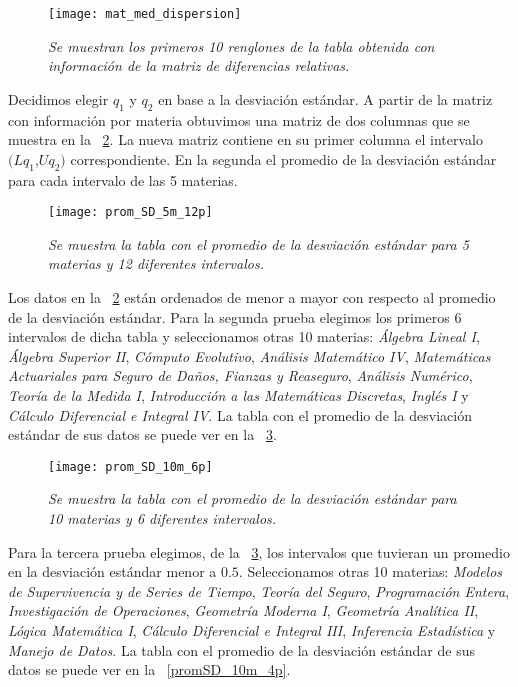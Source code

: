 \begin{figure}[H]
\centering
\texttt{[image: mat\_med\_dispersion]} %
\caption[\textit{Matriz con información por materia}]{\textit{Se muestran los primeros 10 renglones de la tabla obtenida con información de la matriz de diferencias relativas.}}\label{matMedDispersion}
\end{figure}


Decidimos elegir $q_{1}$ y $q_{2}$ en base a la desviación estándar. A partir de la matriz con información por materia obtuvimos una matriz de dos columnas que se muestra en la \figurename{~\ref{promSD_5m_12p}}. La nueva matriz contiene en su primer columna el intervalo $(Lq_{1}$,$Uq_{2})$ correspondiente. En la segunda el promedio de la desviación estándar para cada intervalo de las 5 materias.

\begin{figure}[H]
\centering
\texttt{[image: prom\_SD\_5m\_12p]} %
\caption[\textit{Promedio de la desviación estándar: 5 materias, 12 intervalos}]{\textit{Se muestra la tabla con el promedio de la desviación estándar para 5 materias y 12 diferentes intervalos.}}\label{promSD_5m_12p}
\end{figure}


Los datos en la \figurename{~\ref{promSD_5m_12p}} están ordenados de menor a mayor con respecto al promedio de la desviación estándar. Para la segunda prueba elegimos los primeros 6 intervalos de dicha tabla y seleccionamos otras 10 materias: \textit{Álgebra Lineal I}, \textit{Álgebra Superior II}, \textit{Cómputo Evolutivo}, \textit{Análisis Matemático IV}, \textit{Matemáticas Actuariales para Seguro de Daños, Fianzas y Reaseguro}, \textit{Análisis Numérico}, \textit{Teoría de la Medida I}, \textit{Introducción a las Matemáticas Discretas}, \textit{Inglés I} y \textit{Cálculo Diferencial e Integral IV}. La tabla con el promedio de la desviación estándar de sus datos se puede ver en la \figurename{~\ref{promSD_10m_6p}}.


\begin{figure}[H]
\centering
\texttt{[image: prom\_SD\_10m\_6p]} %
\caption[\textit{Promedio de la desviación estándar: 10 materias, 6 intervalos}]{\textit{Se muestra la tabla con el promedio de la desviación estándar para 10 materias y 6 diferentes intervalos.}}\label{promSD_10m_6p}
\end{figure}


Para la tercera prueba elegimos, de la \figurename{~\ref{promSD_10m_6p}}, los intervalos que tuvieran un promedio en la desviación estándar menor a $0.5$. Seleccionamos otras 10 materias: \textit{Modelos de Supervivencia y de Series de Tiempo}, \textit{Teoría del Seguro}, \textit{Programación Entera}, \textit{Investigación de Operaciones}, \textit{Geometría Moderna I}, \textit{Geometría Analítica II}, \textit{Lógica Matemática I}, \textit{Cálculo Diferencial e Integral III}, \textit{Inferencia Estadística} y \textit{Manejo de Datos}. La tabla con el promedio de la desviación estándar de sus datos se puede ver en la \figurename{~\ref{promSD_10m_4p}}.


